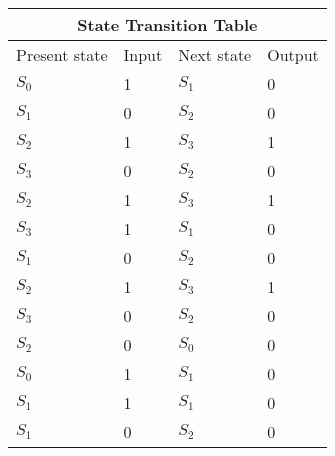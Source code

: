 
\setlength{\arrayrulewidth}{1mm}
\setlength{\tabcolsep}{18pt}
\renewcommand{\arraystretch}{1.5}


\begin{tabular}{ |p{1cm}|p{1cm}|p{1cm}|p{1cm}| }
\hline
\multicolumn{4}{|c|}{State Transition Table} \\
\hline
Present state & Input & Next state & Output  \\
\hline
 $S_0$ & 1 & $S_1$ &0 \\
\hline
$S_1$ & 0 & $S_2$  &0\\
\hline
$S_2$ & 1 & $S_3$  &1\\
\hline
$S_3$ & 0 & $S_2$  &0\\
\hline
$S_2$ & 1 & $S_3$  &1\\
\hline
$S_3$ & 1 & $S_1$  &0\\
\hline
$S_1$ & 0 & $S_2$  &0\\
\hline
$S_2$ & 1 & $S_3$  &1\\
\hline
$S_3$ & 0 & $S_2$  &0\\
\hline
$S_2$ & 0 & $S_0$  &0\\
\hline
$S_0$ & 1 & $S_1$  &0\\
\hline
$S_1$ & 1 & $S_1$  &0\\
\hline
$S_1$ & 0 & $S_2$  &0\\
\hline

\end{tabular}

